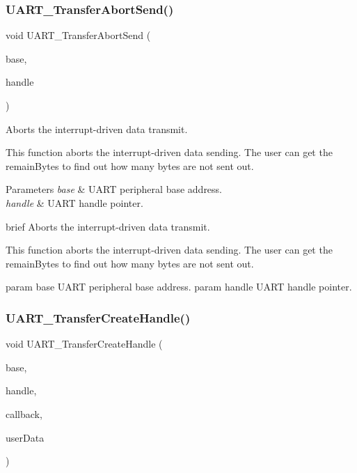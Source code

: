 \subsubsection{\texorpdfstring{UART\_TransferAbortSend()}{UART\_TransferAbortSend()}}
{\footnotesize\ttfamily void U\+A\+R\+T\+\_\+\+Transfer\+Abort\+Send (\begin{DoxyParamCaption}\item[{\mbox{\hyperlink{struct_u_a_r_t___type}{U\+A\+R\+T\+\_\+\+Type}} $\ast$}]{base,  }\item[{\mbox{\hyperlink{struct__uart__handle}{uart\+\_\+handle\+\_\+t}} $\ast$}]{handle }\end{DoxyParamCaption})}



Aborts the interrupt-\/driven data transmit. 

This function aborts the interrupt-\/driven data sending. The user can get the remain\+Bytes to find out how many bytes are not sent out.


\begin{DoxyParams}{Parameters}
{\em base} & U\+A\+RT peripheral base address. \\
\hline
{\em handle} & U\+A\+RT handle pointer.\\
\hline
\end{DoxyParams}
brief Aborts the interrupt-\/driven data transmit.

This function aborts the interrupt-\/driven data sending. The user can get the remain\+Bytes to find out how many bytes are not sent out.

param base U\+A\+RT peripheral base address. param handle U\+A\+RT handle pointer. \mbox{\label{group__uart__driver_ga63db308c32019b7dd6c0647d618e5247}} 
\subsubsection{\texorpdfstring{UART\_TransferCreateHandle()}{UART\_TransferCreateHandle()}}
{\footnotesize\ttfamily void U\+A\+R\+T\+\_\+\+Transfer\+Create\+Handle (\begin{DoxyParamCaption}\item[{\mbox{\hyperlink{struct_u_a_r_t___type}{U\+A\+R\+T\+\_\+\+Type}} $\ast$}]{base,  }\item[{\mbox{\hyperlink{struct__uart__handle}{uart\+\_\+handle\+\_\+t}} $\ast$}]{handle,  }\item[{\mbox{\hyperlink{group__uart__driver_ga2868b6ea396ab212547f2157380429c5}{uart\+\_\+transfer\+\_\+callback\+\_\+t}}}]{callback,  }\item[{void $\ast$}]{user\+Data }\end{DoxyParamCaption})}



